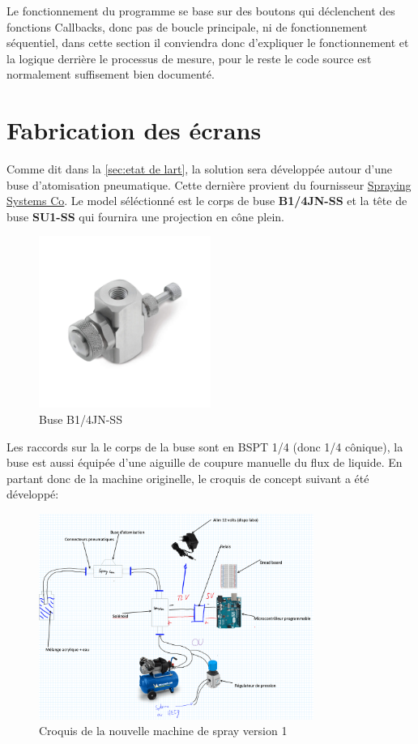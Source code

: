 Le fonctionnement du programme se base sur des boutons qui déclenchent des fonctions Callbacks, donc pas de boucle principale,
ni de fonctionnement séquentiel, dans cette section il conviendra donc d'expliquer le fonctionnement et la logique derrière le processus
de mesure, pour le reste le code source est normalement suffisement bien documenté.
\newpage

\section{Fabrication des écrans}
Comme dit dans la \autoref{sec:etat de lart}, la solution sera développée autour d'une buse d'atomisation pneumatique.
Cette dernière provient du fournisseur \href{https://www.spray.com/fr-eu}{Spraying Systems Co}\footnotemark.
Le model séléctionné est le corps de buse \textbf{B1/4JN-SS} et la tête de buse \textbf{SU1-SS } qui fournira une projection en cône plein.
\begin{figure}[H]
    \centering
    \includegraphics[width = 0.5\textwidth]{assets/figures/ameliorations/J_Series_1_8JN_and_1_4JN.jpeg}
    \caption[Buse B1/4JN-SS]{Buse B1/4JN-SS \cite{image_buse_spray_com}}
\end{figure}
Les raccords sur la le corps de la buse sont en BSPT 1/4 (donc 1/4 cônique), la buse est aussi équipée d'une aiguille de coupure manuelle du flux de liquide.
En partant donc de la machine originelle, le croquis de concept suivant a été développé:
\begin{figure}[H]
    \centering
    \includegraphics[width = 0.8\textwidth]{assets/figures/ameliorations/Croquis_machine_ecran_ver_1.png}
    \caption[Croquis nouvelle machine de spray ver. 1]{Croquis de la nouvelle machine de spray version 1}
\end{figure}

